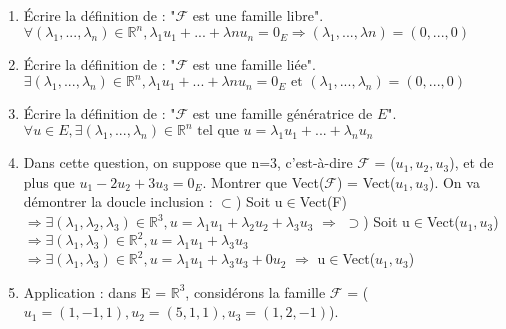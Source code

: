 \documentclass{article}
\begin{document}
\begin{enumerate}
    \item Écrire la définition de : "$\mathcal{F}$ est une famille libre".\newline
    $\forall(\lambda_{1},...,\lambda_{n})\in\mathbb{R}^{n}, \lambda_{1}u_{1}+...+\lambda{n}u_{n} = 0_{E} \Longrightarrow (\lambda_{1},...,\lambda{n})=(0,...,0)$
    \item Écrire la définition de : "$\mathcal{F}$ est une famille liée".\newline
    $\exists(\lambda_{1},...,\lambda_{n})\in\mathbb{R}^{n}, \lambda_{1}u_{1}+...+\lambda{n}u_{n} = 0_{E} \text{ et } (\lambda_{1},...,\lambda_{n})=(0,...,0)$
    \item Écrire la définition de : "$\mathcal{F}$ est une famille génératrice de $E$".\newline
    $\forall u\in E, \exists(\lambda_{1},...,\lambda_{n})\in\mathbb{R}^{n} \text{ tel que } u = \lambda_{1}u_{1}+...+\lambda_{n}u_{n}$
    \item Dans cette question, on suppose que n=3, c'est-à-dire $\mathcal{F}$ = ($u_{1},u_{2},u_{3}$), et de plus que $u_{1}-2u_{2}+3u_{3} = 0_{E}$.\newline
    Montrer que Vect($\mathcal{F}$) = Vect($u_{1},u_{3}$).\newline
    On va démontrer la doucle inclusion :\newline
    $\subset$) Soit u$\in$Vect(F)$\Longrightarrow \exists(\lambda_{1},\lambda_{2},\lambda_{3})\in\mathbb{R}^{3}, u=\lambda_{1}u_{1}+\lambda_{2}u_{2}+\lambda_{3}u_{3}$\newline
    $\Longrightarrow$\newline
    $\supset$) Soit u$\in$Vect($u_{1},u_{3}$) $\Longrightarrow \exists(\lambda_{1},\lambda_{3})\in\mathbb{R}^{2}, u=\lambda_{1}u_{1}+\lambda_{3}u_{3}$\newline
    $\Longrightarrow \exists(\lambda_{1},\lambda_{3})\in\mathbb{R}^{2}, u=\lambda_{1}u_{1}+\lambda_{3}u_{3} + 0u_{2}$\newline
    $\Longrightarrow$ u$\in$Vect($u_{1},u_{3}$)
    \item Application : dans E = $\mathbb{R}^{3}$, considérons la famille $\mathcal{F}$ = ($u_{1}=(1,-1,1),u_{2}=(5,1,1),u_{3}=(1,2,-1)$).
\end{enumerate}
\end{document}
